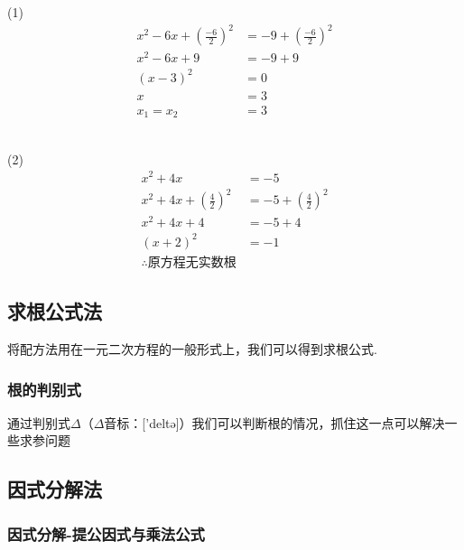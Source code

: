 \documentclass[lang=cn, 10pt, titlestyle=hang, oneside]{elegantbook}
\begin{document}
\begin{solution}
    \begin{multicols}{2}
    \begin{minipage}{1\linewidth}
        (1)
        \begin{align*}
        x^2 - 6x + \left(\frac{-6}{2}\right)^2 &= -9 + \left(\frac{-6}{2}\right)^2 \\
        x^2 - 6x + 9 &= -9 + 9 \\
        (x - 3)^2 &= 0 \\
        x &= 3 \\
        x_1=x_2 &= 3
        \end{align*}\\
    \end{minipage}
    \begin{minipage}{1\linewidth}
        (2)
        \begin{align*}
        x^2 + 4x &= -5 \\
        x^2 + 4x + \left(\frac{4}{2}\right)^2 &= -5 + \left(\frac{4}{2}\right)^2 \\
        x^2 + 4x + 4 &= -5 + 4 \\
        (x + 2)^2 &= -1 \\
        \therefore \text{原方程无实数根}
        \end{align*}
    \end{minipage}
    \end{multicols}
\end{solution}
\subsection{求根公式法}



将配方法用在一元二次方程的一般形式上，我们可以得到求根公式.

\subsubsection{根的判别式}

通过判别式\(\Delta \)（\(\Delta \)音标：['deltə]）我们可以判断根的情况，抓住这一点可以解决一些求参问题


\subsection{因式分解法}

\subsubsection{因式分解-提公因式与乘法公式}
\end{document}
